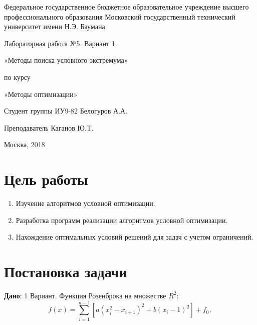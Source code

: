 \documentclass[a4paper, 12pt]{article}   	%
\begin{document}
\begin{titlepage}

\thispagestyle{empty}

\begin{center}
Федеральное государственное бюджетное образовательное учреждение высшего профессионального образования Московский государственный технический университет имени Н.Э. Баумана
\end{center}


\vfill

\centerline{\large{Лабораторная работа №5. Вариант 1.}}

\centerline{\large{«Методы поиска условного экстремума»}} 

\centerline{\large{по курсу}}
\centerline{\large{«Методы оптимизации»}}


\vfill

Студент группы ИУ9-82 \hfill Белогуров А.А.

Преподаватель \hfill Каганов Ю.T. 
\vfill

\centerline{Москва, 2018}
\clearpage
\end{titlepage}

\newpage
\setcounter{page}{2}

\tableofcontents

\newpage

\section{Цель работы}

\begin{enumerate}
    \item Изучение алгоритмов условной оптимизации.
    \item Разработка программ реализации алгоритмов условной оптимизации.
    \item Нахождение оптимальных условий решений для задач с учетом ограничений.
\end{enumerate}

\newpage

\section{Постановка задачи}
    \textbf {Дано}: 1 Вариант. Функция Розенброка на множестве $R^2$:
    \begin{equation}
        f(x) = \sum^{n-1}_{i=1}{[a(x_i^2 - x_{i+1})^2 + b(x_i - 1)^2] + f_0},
    \end{equation}
    
\end{document}
